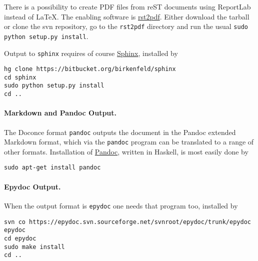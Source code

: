 \documentclass[twoside]{article}
\begin{document}
There is a possibility to create PDF files from reST documents
using ReportLab instead of {\LaTeX}. The enabling software is
\href{{http://code.google.com/p/rst2pdf}}{rst2pdf}. Either download the tarball
or clone the svn repository, go to the {\fontsize{10pt}{10pt}\verb!rst2pdf!} directory and
run the usual {\fontsize{10pt}{10pt}\verb!sudo python setup.py install!}.


Output to {\fontsize{10pt}{10pt}\verb!sphinx!} requires of course \href{{http://sphinx.pocoo.org}}{Sphinx},
installed by
\vspace{4pt}
\begin{Verbatim}[numbers=none,frame=lines,label=\fbox{{\tiny Terminal}},fontsize=\fontsize{9pt}{9pt},
labelposition=topline,framesep=2.5mm,framerule=0.7pt]
hg clone https://bitbucket.org/birkenfeld/sphinx
cd sphinx
sudo python setup.py install
cd ..
\end{Verbatim}

\paragraph{Markdown and Pandoc Output.}
The Doconce format {\fontsize{10pt}{10pt}\verb!pandoc!} outputs the document in the Pandoc
extended Markdown format, which via the {\fontsize{10pt}{10pt}\verb!pandoc!} program can be
translated to a range of other formats. Installation of \href{{http://johnmacfarlane.net/pandoc/}}{Pandoc}, written in Haskell, is most
easily done by

\vspace{4pt}
\begin{Verbatim}[numbers=none,frame=lines,label=\fbox{{\tiny Terminal}},fontsize=\fontsize{9pt}{9pt},
labelposition=topline,framesep=2.5mm,framerule=0.7pt]
sudo apt-get install pandoc
\end{Verbatim}

\paragraph{Epydoc Output.}
When the output format is {\fontsize{10pt}{10pt}\verb!epydoc!} one needs that program too, installed
by
\vspace{4pt}
\begin{Verbatim}[numbers=none,frame=lines,label=\fbox{{\tiny Terminal}},fontsize=\fontsize{9pt}{9pt},
labelposition=topline,framesep=2.5mm,framerule=0.7pt]
svn co https://epydoc.svn.sourceforge.net/svnroot/epydoc/trunk/epydoc epydoc
cd epydoc
sudo make install
cd ..
\end{Verbatim}
\end{document}
